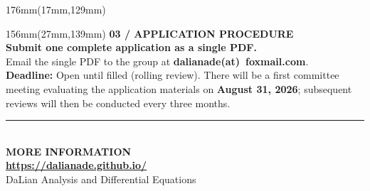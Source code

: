 \documentclass[10pt]{article}
\newcommand{\FirstReviewDate}{August 31, 2026}
\newcommand{\EmailUser}{dalianade}
\newcommand{\EmailDomain}{foxmail.com}
\newcommand{\Website}{https://dalianade.github.io/}
\newcommand{\ObfuscatedEmail}{\EmailUser\textbf{(at)}\ \EmailDomain}
\newcommand{\Kicker}[1]{%
  {\color{DLADEBlue}\bfseries\fontsize{8.1}{10}\selectfont\MakeUppercase{#1}}%
}
\begin{document}
\begin{textblock*}{176mm}(17mm,129mm)
\end{textblock*}
\begin{textblock*}{156mm}(27mm,139mm)
  \Kicker{03 / Application procedure}\\[4mm]
  {\DisplayFont\bfseries\color{DLADENavyDark}\fontsize{20.5}{24}\selectfont
  Submit one complete application as a single PDF.}\\[4mm]
  {\color{DLADEInk}\fontsize{9}{13}\selectfont
  Email the single PDF to the group at
  {\color{DLADEBlue}\bfseries\ObfuscatedEmail}.}\\[4mm]
  {\color{DLADEMuted}\fontsize{8.8}{12.5}\selectfont
  \textbf{Deadline:} Open until filled (rolling review). There will be a first committee meeting
  evaluating the application materials on \textbf{\FirstReviewDate}; subsequent reviews will then be
  conducted every three months.}

  \vspace{6mm}\color{DLADELine}\rule{156mm}{.2mm}\\[5mm]
  \Kicker{More information}\\[3mm]
  {\color{DLADEBlue}\bfseries\fontsize{10}{12}\selectfont\href{\Website}{\Website}}\\[1.5mm]
  {\color{DLADEMuted}\fontsize{7.8}{9}\selectfont DaLian Analysis and Differential Equations}
\end{textblock*}
\end{document}
